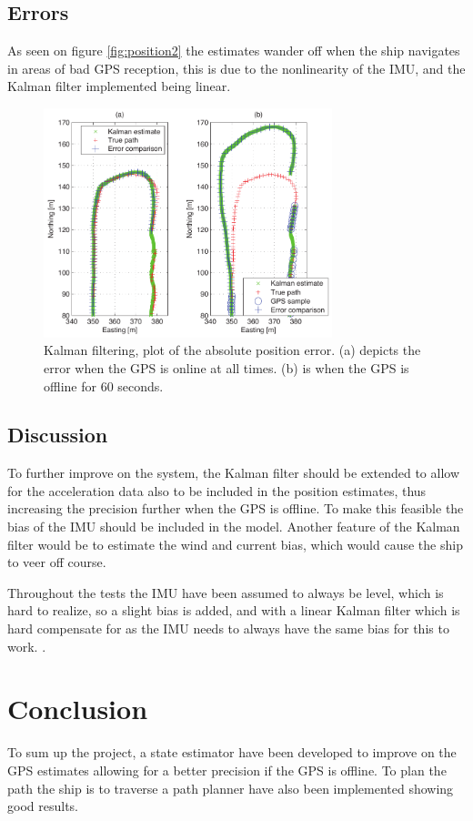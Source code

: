 \documentclass{ifacconf}
\begin{document}
\subsection{Errors}
As seen on figure \ref{fig:position2} the estimates wander off when the ship navigates in areas of bad GPS reception, this is due to the nonlinearity of the IMU, and the Kalman filter implemented being linear. 
\begin{figure}
	\begin{center}
		\includegraphics[width=8.4cm]{img/states2}    %
		\caption{Kalman filtering, plot of the absolute position error. (a) depicts the error when the GPS is online at all times. (b) is when the GPS is offline for 60 seconds.}  %
		\label{fig:states2}               
	\end{center}                                 %
\end{figure}


\subsection{Discussion}
To further improve on the system, the Kalman filter should be extended to allow for the acceleration data also to be included in the position estimates, thus increasing the precision further when the GPS is offline. To make this feasible the bias of the IMU should be included in the model. Another feature of the Kalman filter would be to estimate the wind and current bias, which would cause the ship to veer off course. 

Throughout the tests the IMU have been assumed to always be level, which is hard to realize, so a slight bias is added, and with a linear Kalman filter which is hard compensate for as the IMU needs to always have the same bias for this to work. .

\section{Conclusion}
To sum up the project, a state estimator have been developed to improve on the GPS estimates allowing for a better precision if the GPS is offline. To plan the path the ship is to traverse a path planner have also been implemented showing good results. 
\end{document}
